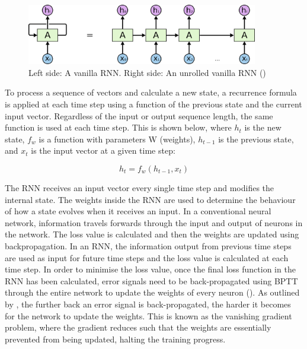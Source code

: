 \begin{figure}[ht!]
\centering
\includegraphics[width=0.9\textwidth]{media/literature/machine_learning/ml_rnn_unrolled.png}
\caption[Diagram of an unrolled Recurrent Neural Network]{Left side: A vanilla \acrlong{RNN}. Right side: An unrolled vanilla \acrlong{RNN} (\cite{colah_lstm_2019})}
\label{fig:rnn_unrolled}
\end{figure}

To process a sequence of vectors and calculate a new state, a recurrence formula is applied at each time step using a function of the previous state and the current input vector. Regardless of the input or output sequence length, the same function is used at each time step. This is shown below, where $h_t$ is the new state, $f_w$ is a function with parameters W (weights), $h_{t-1}$ is the previous state, and $x_t$ is the input vector at a given time step: 

\begin{equation}
    h_{t} = f_{w} \left ( h_{t-1},x_{t} \right )
\end{equation}

The \acrshort{RNN} receives an input vector every single time step and modifies the internal state. The weights inside the \acrshort{RNN} are used to determine the behaviour of how a state evolves when it receives an input. 
In a conventional neural network, information travels forwards through the input and output of neurons in the network. The loss value is calculated and then the weights are updated using backpropagation.
In an \acrshort{RNN}, the information output from previous time steps are used as input for future time steps and the loss value is calculated at each time step. In order to minimise the loss value, once the final loss function in the \acrshort{RNN} has been calculated, error signals need to be back-propagated using \acrfull{BPTT} through the entire network to update the weights of every neuron (\cite{salehinejad_recent_rnn_2018}).
As outlined by \cite{bengio_learning_1994}, the further back an error signal is back-propagated, the harder it becomes for the network to update the weights. This is known as the vanishing gradient problem, where the gradient reduces such that the weights are essentially prevented from being updated, halting the training progress.

